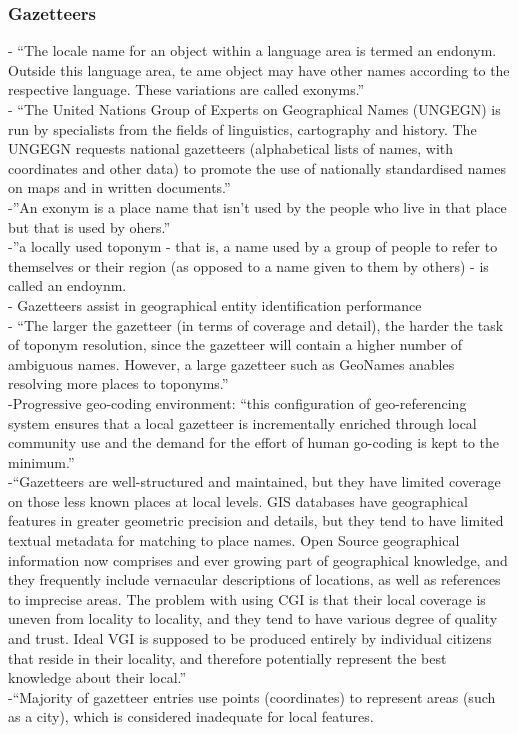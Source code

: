 \subsubsection{Gazetteers}
-{\color{orange} “The locale name for an object within a language area is termed an endonym. Outside this language area, te ame object may have other names according to the respective language. These variations are called exonyms.” \cite{Witschas2004}}\\
-{\color{orange} “The United Nations Group of Experts on Geographical Names (UNGEGN) is run by specialists from the fields of linguistics, cartography and history. The UNGEGN requests national gazetteers (alphabetical lists of names, with coordinates and other data) to promote the use of nationally standardised names on maps and in written documents.”\cite{Witschas2004}}\\
-{\color{orange}''An exonym is a place name that isn't used by the people who live in that place but that is used by ohers.''\cite{Nordquist2018}}\\
-{\color{orange}''a locally used toponym - that is, a name used by a group of people to refer to themselves or their region (as opposed to a name given to them by others) - is called an endoynm.\cite{Nordquist2018}}\\
-{\color{orange} Gazetteers assist in geographical entity identification performance\cite{Silva2006}}\\
-{\color{orange} “The larger the gazetteer (in terms of coverage and detail), the harder the task of toponym resolution, since the gazetteer will contain a higher number of ambiguous names. However, a large gazetteer such as GeoNames anables resolving more places to toponyms.” \cite{Karimzadeh2019a}}\\
-{\color{orange}Progressive geo-coding environment: “this configuration of geo-referencing system ensures that a local gazetteer is incrementally enriched through local community use and the demand for the effort of human go-coding is kept to the minimum.”\cite{Cai2016}}\\
-{\color{orange}“Gazetteers are well-structured and maintained, but they have limited coverage on those less known places at local levels. GIS databases have geographical features in greater geometric precision and details, but they tend to have limited textual metadata for matching to place names. Open Source geographical information now comprises and ever growing part of geographical knowledge, and they frequently include vernacular descriptions of locations, as well as references to imprecise areas. The problem with using CGI is that their local coverage is uneven from locality to locality, and they tend to have various degree of quality and trust. Ideal VGI is supposed to be produced entirely by individual citizens that reside in their locality, and therefore potentially represent the best knowledge about their local.”\cite{Cai2016}}\\
-{\color{orange}“Majority of gazetteer entries use points (coordinates) to represent areas (such as a city), which is considered inadequate for local features.\cite{Cai2016}}\\

